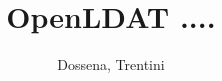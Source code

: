 \documentclass[]{article}
\title{OpenLDAT ....}
\author{Dossena, Trentini}
\begin{document}
\maketitle
\listoftodos
\tableofcontents





\end{document}
